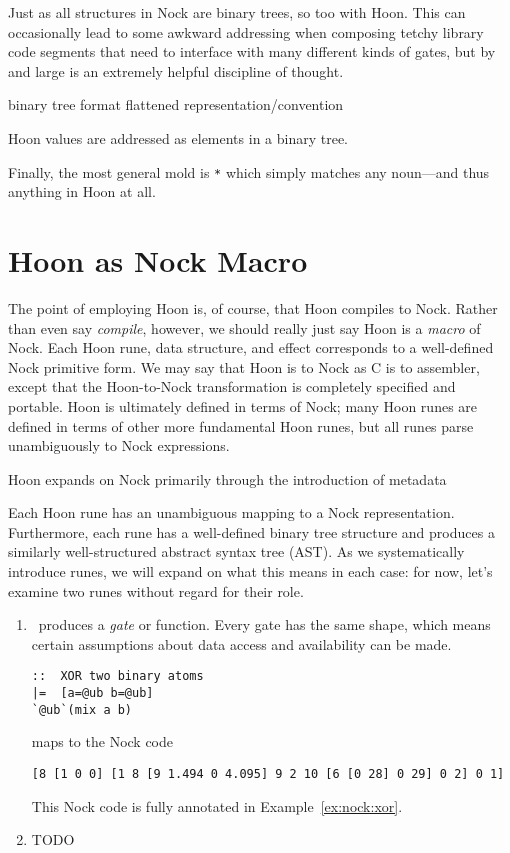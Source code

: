 Just as all structures in Nock are binary trees, so too with Hoon.  This can occasionally lead to some awkward addressing when composing tetchy library code segments that need to interface with many different kinds of gates, but by and large is an extremely helpful discipline of thought.


binary tree format
flattened representation/convention


Hoon values are addressed as elements in a binary tree.


Finally, the most general mold is \texttt{*} which simply matches any noun—and thus anything in Hoon at all.

\section{Hoon as Nock Macro}

The point of employing Hoon is, of course, that Hoon compiles to Nock.  Rather than even say \emph{compile}, however, we should really just say Hoon is a \emph{macro} of Nock.  Each Hoon rune, data structure, and effect corresponds to a well-defined Nock primitive form.  We may say that Hoon is to Nock as C is to assembler, except that the Hoon-to-Nock transformation is completely specified and portable.  Hoon is ultimately defined in terms of Nock; many Hoon runes are defined in terms of other more fundamental Hoon runes, but all runes parse unambiguously to Nock expressions.


Hoon expands on Nock primarily through the introduction of metadata


Each Hoon rune has an unambiguous mapping to a Nock representation.  Furthermore, each rune has a well-defined binary tree structure and produces a similarly well-structured abstract syntax tree (AST).  As we systematically introduce runes, we will expand on what this means in each case:  for now, let's examine two runes without regard for their role.

\begin{enumerate}
  \item  \pbartis~produces a \emph{gate} or function.  Every gate has the same shape, which means certain assumptions about data access and availability can be made.

    \begin{lstlisting}[language=hoon,
                       style=nonumbers]
::  XOR two binary atoms
|=  [a=@ub b=@ub]
`@ub`(mix a b)
    \end{lstlisting}

    maps to the Nock code

    \begin{lstlisting}[language=hoon,
                       style=nonumbers]
[8 [1 0 0] [1 8 [9 1.494 0 4.095] 9 2 10 [6 [0 28] 0 29] 0 2] 0 1]
    \end{lstlisting}

    This Nock code is fully annotated in Example~\ref{ex:nock:xor}.

  \item  TODO
\end{enumerate}


